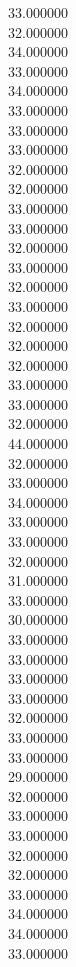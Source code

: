 33.000000\\
32.000000\\
34.000000\\
33.000000\\
34.000000\\
33.000000\\
33.000000\\
33.000000\\
32.000000\\
32.000000\\
33.000000\\
33.000000\\
32.000000\\
33.000000\\
32.000000\\
33.000000\\
32.000000\\
32.000000\\
32.000000\\
33.000000\\
33.000000\\
32.000000\\
44.000000\\
32.000000\\
33.000000\\
34.000000\\
33.000000\\
33.000000\\
32.000000\\
31.000000\\
33.000000\\
30.000000\\
33.000000\\
33.000000\\
33.000000\\
33.000000\\
32.000000\\
33.000000\\
33.000000\\
29.000000\\
32.000000\\
33.000000\\
33.000000\\
32.000000\\
32.000000\\
33.000000\\
34.000000\\
34.000000\\
33.000000\\
